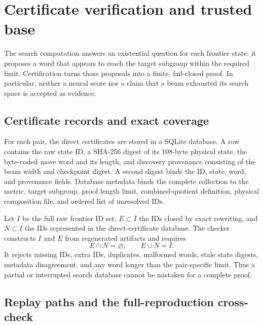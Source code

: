 \section{Certificate verification and trusted base}
\label{sec:verification}

The search computation answers an existential question for each frontier
state: it proposes a word that appears to reach the target subgroup within the
required limit.  Certification turns those proposals into a finite,
fail-closed proof.  In particular, neither a neural score nor a claim that a
beam exhausted its search space is accepted as evidence.

\subsection{Certificate records and exact coverage}

For each pair, the direct certificates are stored in a SQLite database.  A
row contains the raw state ID, a SHA-256 digest of its 108-byte physical state,
the byte-coded move word and its length, and discovery provenance consisting
of the beam width and checkpoint digest.  A second digest binds the ID, state,
word, and provenance fields.  Database metadata binds the complete collection
to the metric, target subgroup, proof length limit, combined-quotient
definition, physical composition file, and ordered list of unresolved IDs.

Let $I$ be the full raw frontier ID set, $E\subset I$ the IDs closed by exact
rewriting, and $N\subset I$ the IDs represented in the direct-certificate
database.  The checker constructs $I$ and $E$ from regenerated artifacts and
requires
\begin{equation}
  E\cap N=\varnothing,
  \qquad E\cup N=I.
  \label{eq:exact-partition}
\end{equation}
It rejects missing IDs, extra IDs, duplicates, malformed words, stale state
digests, metadata disagreement, and any word longer than the pair-specific
limit.  Thus a partial or interrupted search database cannot be mistaken for
a complete proof.

\subsection{Replay paths and the full-reproduction cross-check}

